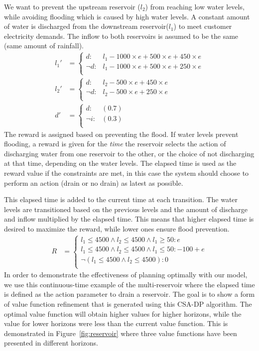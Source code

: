 \documentclass[letterpaper]{article}
\begin{document}
We want to prevent the upstream reservoir ($l_2$) from reaching low water
levels, while avoiding flooding which is caused by high water levels. A
constant amount of water is discharged from the downstream reservoir($l_1$)
to meet customer electricity demands. The inflow to both reservoirs is
assumed to be the same (same amount of rainfall).
{\footnotesize
\begin{align*}
l_1' & = \begin{cases}
  d : & l_1 - 1000 \times e + 500 \times e +450 \times e \\
  \neg d: & l_1 - 1000 \times e + 500 \times e +250 \times e \\
  \end{cases}\\
l_2' & = \begin{cases}
  d : & l_2 - 500 \times e +450 \times e \\
  \neg d: & l_2 - 500 \times e +250 \times e \\
  \end{cases}\\
d' & = \begin{cases}
  d : & (0.7) \\
  \neg i: & (0.3) \\
  \end{cases}
\end{align*}}
The reward is assigned based on preventing the flood. If water levels
prevent flooding, a reward is given for the \textit{time} the reservoir
selects the action of discharging water from one reservoir to the other, or
the choice of not discharging at that time, depending on the water levels.
The elapsed time is used as the reward value if the constraints are met, in
this case the system should choose to perform an action (drain or no drain)
as latest as possible.

This elapsed time is added to the current time at each transition. The water
levels are transitioned based on the previous levels and the amount of
discharge and inflow multiplied by the elapsed time. This means that higher
elapsed time is desired to maximize the reward, while lower ones ensure
flood prevention.
{\footnotesize
\begin{align*}
R & = \begin{cases}
l_1 \leq 4500 \wedge l_2 \leq 4500 \wedge l_1\geq 50 : e \\
l_1 \leq 4500 \wedge l_2 \leq 4500 \wedge l_1\leq 50 : -100+e \\
\neg(l_1 \leq 4500 \wedge l_2 \leq 4500) : 0 \\
\end{cases}
\end{align*}} 
In order to demonstrate the effectiveness of planning optimally with our
model, we use this continuous-time example of the multi-reservoir where the
elapsed time is defined as the action parameter to drain a reservoir. The
goal is to show a form of value function refinement that is generated using
this CSA-DP algorithm. The optimal value function will obtain higher values
for higher horizons, while the value for lower horizons were less than the
current value function. This is demonstrated in Figure~\ref{fig:reservoir}
where three value functions have been presented in different horizons.
 
\end{document}
